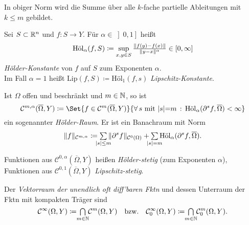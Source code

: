 \documentclass{cheat-sheet}
\newcommand{\Hoel}{\mathrm{\text{Höl}}} %
\begin{document}
\begin{bem}
  In obiger Norm wird die Summe über alle $k$-fache partielle Ableitungen mit $k \leq m$ gebildet.
\end{bem}


\begin{defn}
  Sei $S \subset \mathbb{R}^n$ und $f : S \to Y$. Für $\alpha \in \left] 0, 1 \right]$ heißt
  \[ \Hoel_\alpha(f, S) \coloneqq \sup_{x, y \in S} \tfrac{\norm{f(y)-f(x)}}{\norm{y-x}^\alpha} \in \left[ 0 , \infty \right] \]
  \emph{Hölder-Konstante} von $f$ auf $S$ zum Exponenten $\alpha$.\\
  Im Fall $\alpha {=} 1$ heißt $\mathrm{Lip}(f, S) \coloneqq \Hoel_1(f, s)$ \emph{Lipschitz-Konstante}.
\end{defn}

\begin{defn}
  Ist $\Omega$ offen und beschränkt und $m \in \mathbb{N}$, so ist
  \[ \mathcal{C}^{m,\alpha}(\overline{\Omega}, Y) \coloneqq \Set{ f \in \mathcal{C}^m(\overline{\Omega}, Y) }{ \fa{s \text{ mit } \abs{s} {=} m} \Hoel_\alpha(\partial^s f, \overline{\Omega}) < \infty } \]
  ein sogenannter \emph{Hölder-Raum}. Er ist ein Banachraum mit Norm
  \[ \norm{f}_{\mathcal{C}^{m,\alpha}} \coloneqq \sum_{\mathclap{\abs{s} \leq m}} \, \norm{\partial^s f}_{\mathcal{C}^0(\Omega)} + \sum_{\mathclap{\abs{s} = m}} \Hoel_\alpha(\partial^s f, \overline{\Omega}). \]
\end{defn}

\begin{defn}
  Funktionen aus $\mathcal{C}^{0,\alpha}(\overline{\Omega}, Y)$ heißen \emph{Hölder-stetig} (zum Exponenten $\alpha$), Funktionen aus $\mathcal{C}^{0,1}(\overline{\Omega}, Y)$ \emph{Lipschitz-stetig}.
\end{defn}

\begin{defn}
  Der \emph{Vektorraum der unendlich oft diff'baren Fktn} und dessen Unterraum der Fktn mit kompakten Träger sind
  \[
    \mathcal{C}^\infty(\Omega, Y) \coloneqq \, \bigcap_{\mathclap{m \in \N}} \, \mathcal{C}^m(\Omega, Y)
    \quad \text{bzw.} \quad
    \mathcal{C}_0^\infty(\Omega, Y) \coloneqq \, \bigcap_{\mathclap{m \in \N}} \, \mathcal{C}_0^m(\Omega, Y).
  \]
\end{defn}

\end{document}
